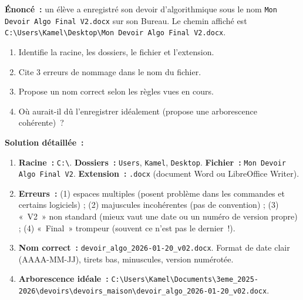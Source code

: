 \documentclass[11pt]{article}
\begin{document}
\begin{exoresolu}
\textbf{Énoncé~:} un élève a enregistré son devoir d'algorithmique sous le nom \texttt{Mon Devoir Algo Final V2.docx} sur son Bureau. Le chemin affiché est \texttt{C:\textbackslash{}Users\textbackslash{}Kamel\textbackslash{}Desktop\textbackslash{}Mon Devoir Algo Final V2.docx}.
\begin{enumerate}
    \item Identifie la racine, les dossiers, le fichier et l'extension.
    \item Cite 3 erreurs de nommage dans le nom du fichier.
    \item Propose un nom correct selon les règles vues en cours.
    \item Où aurait-il dû l'enregistrer idéalement (propose une arborescence cohérente)~?
\end{enumerate}
\tcblower
\textbf{Solution détaillée~:}
\begin{enumerate}
    \item \textbf{Racine~:} \texttt{C:\textbackslash{}}. \textbf{Dossiers~:} \texttt{Users}, \texttt{Kamel}, \texttt{Desktop}. \textbf{Fichier~:} \texttt{Mon Devoir Algo Final V2}. \textbf{Extension~:} \texttt{.docx} (document Word ou LibreOffice Writer).
    \item \textbf{Erreurs~:} (1) espaces multiples (posent problème dans les commandes et certains logiciels) ; (2) majuscules incohérentes (pas de convention) ; (3) «~V2~» non standard (mieux vaut une date ou un numéro de version propre) ; (4) «~Final~» trompeur (souvent ce n'est pas le dernier~!).
    \item \textbf{Nom correct~:} \texttt{devoir\_algo\_2026-01-20\_v02.docx}. Format de date clair (AAAA-MM-JJ), tirets bas, minuscules, version numérotée.
    \item \textbf{Arborescence idéale~:} \texttt{C:\textbackslash{}Users\textbackslash{}Kamel\textbackslash{}Documents\textbackslash{}3eme\_2025-2026\textbackslash{}devoirs\textbackslash{}devoirs\_maison\textbackslash{}devoir\_algo\_2026-01-20\_v02.docx}.
\end{enumerate}
\end{exoresolu}
\end{document}

